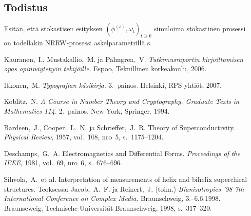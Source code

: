 \documentclass[finnish, 12pt, a4paper, sci, utf8, pdfa]{aaltothesis}
\begin{document}
\subsection{Todistus}

Esitän, että stokastisen esityksen \( (\phi^{(t)}, \omega_{t})_{t \geq 0} \) simuloima stokastinen prosessi on todellakin NRRW-prosessi askelparametrillä s.


\clearpage

\thesisbibliography

\begin{thebibliography}{99}

 Kauranen,\ I., Mustakallio,\ M. ja Palmgren,\ V.
  \textit{Tutkimusraportin kirjoittamisen opas opinnäytetyön
    tekijöille.}  Espoo, Teknillinen korkeakoulu, 2006.

 Itkonen,\ M. \textit{Typografian käsikirja.} 3.\
  painos.  Helsinki, RPS-yhtiöt, 2007.

 Koblitz,\ N. \textit{A Course in Number Theory and
    Cryptography. Graduate Texts in Mathematics 114.}  2.\ painos. New
  York, Springer, 1994.

\bibitem{bcs} Bardeen,\ J., Cooper,\ L.\ N. ja Schrieffer,\ J.\ R.
  Theory of Superconductivity. \textit{Physical Review,} 1957, vol.\
  108, nro~5, s.\ 1175--1204.

 Deschamps,\ G.\ A. Electromagnetics and
  Differential Forms. \textit{Proceedings of the IEEE,} 1981, vol.\
  69, nro~6, s.\ 676--696.

\bibitem{Sihvola} Sihvola,\ A.\ et al.
  \foreignlanguage{english}{Interpretation of measurements of helix 
    and bihelix superchiral structures.}
  Teoksessa: Jacob,\ A.\ F. ja
  Reinert,\ J. (toim.) \textit{Bianisotropics '98 7th International
    Conference on Complex Media.}  Braunschweig, 3.--6.6.1998.
  Braunscweig, Technische Universität Braunschweig, 1998, s.\
  317--320.


\end{thebibliography}
\end{document}
